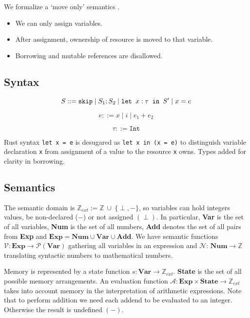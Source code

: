 We formalize a `move only' semantics \cite{wessel2019semantics}.

\begin{itemize}
	\item We can only assign variables. 
	\item After assignment, ownership of resource is moved to that variable. 
	\item Borrowing and mutable references are disallowed.
\end{itemize}

\subsection{Syntax}

$$S ::= \texttt{skip} \mid S_1; S_2 \mid \texttt{let }x : \tau \texttt{ in } S' \mid x = e$$

$$e ::= x \mid i \mid e_1 + e_2$$

$$\tau ::= \texttt{Int}$$

Rust syntax \verb|let x = e| is desugared as \texttt{let x in (x = e)} to distinguish variable declaration \verb|x| from assignment of a value to the resource \verb|x| owns. Types added for clarity in borrowing.

\subsection{Semantics}

The semantic domain is $\mathbb{Z}_{ext} := \mathbb{Z} ~\cup ~ \{\perp, -\}$, so variables can hold integers values, be non-declared ($-$) or not assigned $(\perp)$. In particular, \textbf{Var} is the set of all variables, \textbf{Num} is the set of all numbers, \textbf{Add} denotes the set of all pairs from \textbf{Exp} and $\textbf{Exp} = \textbf{Num} \cup \textbf{Var} \cup \textbf{Add}$. We have semantic functions $\mathcal{V}: \textbf{Exp} \to \mathcal{P}(\textbf{Var})$ gathering all variables in an expression and $\mathcal{N}$: $\textbf{Num} \to \mathbb{Z}$ translating syntactic numbers to mathematical numbers.

Memory is represented by a state function $s: \textbf{Var} \to \mathbb{Z}_{ext}$. \textbf{State} is the set of all possible memory arrangements. An evaluation function $\mathcal{A}: \textbf{Exp} \times \textbf{State} \to \mathbb{Z}_{ext}$ takes into account memory in the interpretation of arithmetic expressions. Note that to perform addition we need each addend to be evaluated to an integer. Otherwise the result is undefined $(-)$. 

